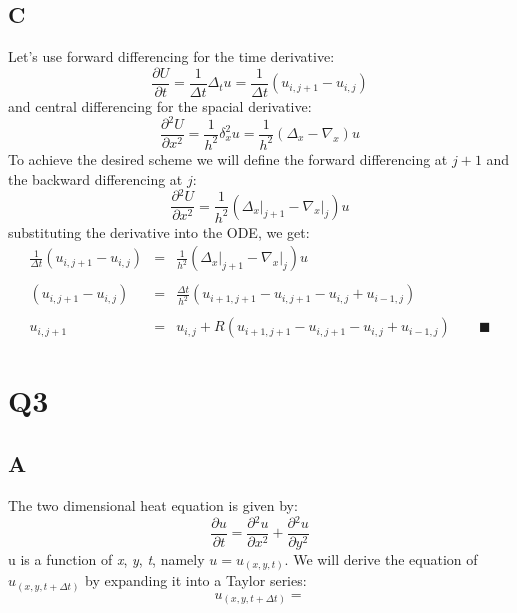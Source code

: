 \documentclass[11pt, a4paper]{article}
\newcommand{\parder}[2]{\frac{\partial {#1}}{\partial {#2}}}
\begin{document}
\subsection{C}
Let's use forward differencing for the time derivative:
\begin{equation}
    \parder{U}{t}=\frac{1}{\Delta t}\Delta_tu=\frac{1}{\Delta t}\left(u_{i,j+1}-u_{i,j}\right)
\end{equation}
and central differencing for the spacial derivative:
\begin{equation}
    \parder{^2U}{x^2}=\frac{1}{h^2}\delta_x^2u=\frac{1}{h^2}\left(\Delta_x-\nabla_x\right)u
\end{equation}
To achieve the desired scheme we will define the forward differencing at $j+1$ and the backward differencing at $j$:
\begin{equation}
    \parder{^2U}{x^2}=\frac{1}{h^2}\left(\left.\Delta_x\right|_{j+1}-\left.\nabla_x\right|_j\right)u
\end{equation}
substituting the derivative into the ODE, we get:
\begin{equation}
    \begin{array}{rcl}
        \displaystyle \frac{1}{\Delta t}\left(u_{i,j+1}-u_{i,j}\right) & = & \displaystyle \frac{1}{h^2}\left(\left.\Delta_x\right|_{j+1}-\left.\nabla_x\right|_j\right)u \\\\
        \displaystyle \left(u_{i,j+1}-u_{i,j}\right) & = & \displaystyle \frac{\Delta t}{h^2}\left(u_{i+1,j+1}-u_{i,j+1}-u_{i,j}+u_{i-1,j}\right) \\\\
        \displaystyle u_{i,j+1} & = & \displaystyle u_{i,j}+R\left(u_{i+1,j+1}-u_{i,j+1}-u_{i,j}+u_{i-1,j}\right)\qquad\blacksquare
    \end{array}
\end{equation}

\section{Q3}
\subsection{A}
The two dimensional heat equation is given by:
\begin{equation}
    \parder{u}{t}=\parder{^2u}{x^2}+\parder{^2u}{y^2}
\end{equation}
u is a function of \emph{x}, \emph{y}, \emph{t}, namely $u=u_{\left(x,y,t\right)}$. We will derive the equation of $u_{\left(x,y,t+\Delta t\right)}$ by expanding it into a Taylor series:
\begin{equation}
    u_{\left(x,y,t+\Delta t\right)}=
\end{equation}
\end{document}
